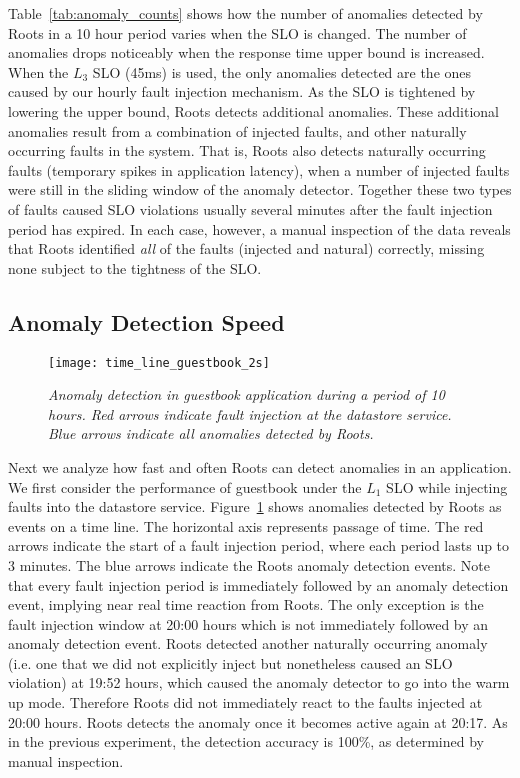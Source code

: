 Table~\ref{tab:anomaly_counts} shows how the number of anomalies detected by 
Roots in a 10 hour period varies when the SLO is changed. The number of anomalies
drops noticeably when the response time upper bound is increased. When the $L_3$
SLO (45ms) is used, the only anomalies detected are the ones
caused by our hourly fault injection mechanism. As the SLO is tightened by lowering the upper bound,
Roots detects additional anomalies. These additional anomalies
result from a combination of injected faults, and other naturally occurring faults
in the system. That is, Roots also detects naturally occurring
faults (temporary spikes in application latency), when a number of injected faults
were still in the sliding window of the anomaly detector. Together these two types of
faults caused SLO violations usually several minutes after the fault injection period
has expired.  In each case, however, a manual inspection of the data reveals
that Roots identified \textit{all} of the faults (injected and natural) correctly,
missing none subject to the tightness of the SLO.

\subsection{Anomaly Detection Speed}

\begin{figure}
\centering
\texttt{[image: time\_line\_guestbook\_2s]}
\vspace{-0.3in}
\caption{\textit{Anomaly detection in guestbook application during a period of 10 hours. 
Red arrows indicate fault injection
at the datastore service. Blue arrows indicate all anomalies detected by
Roots.
}}
\label{fig:time_line_guestbook_2s}
\end{figure}

Next we analyze how fast and often Roots can detect anomalies in an application. We
first consider the performance of guestbook under the $L_1$ SLO while 
injecting faults into the datastore service. Figure~\ref{fig:time_line_guestbook_2s} shows
anomalies detected by Roots as events on a time line. The horizontal axis represents 
passage of time. The red arrows indicate the start of a fault injection period, where each
period lasts up to 3 minutes.
The blue arrows indicate the Roots anomaly detection events.
Note that every fault injection period is immediately followed by an anomaly
detection event, implying near real time reaction from Roots. The only exception is the fault
injection window at 20:00 hours which is not immediately followed by an anomaly 
detection event. Roots detected another naturally occurring anomaly
(i.e. one
that we did not explicitly inject but nonetheless caused an SLO violation) at 19:52 hours,
which caused the anomaly detector to go into the warm up mode. Therefore Roots
did not immediately react to the faults injected at 20:00 hours. Roots detects the anomaly once it becomes
active again at 20:17. As in the previous
experiment, the detection accuracy is 100\%, as determined by manual
inspection.

